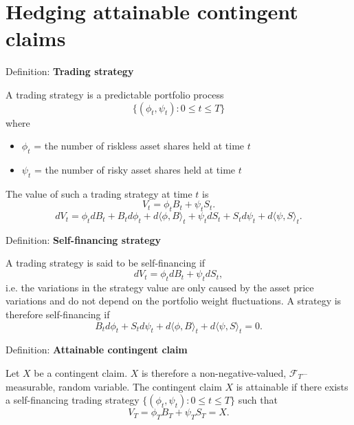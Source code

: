 \documentclass[12pt,a4paper]{article}
\begin{document}
\vspace{1em}


\section{Hedging attainable contingent claims}

Definition: \textbf{Trading strategy}
\vspace{0.5em}

A trading strategy is a predictable portfolio process
\[
\{(\phi_t, \psi_t) : 0 \leq t \leq T\}
\]
where
\begin{itemize}
	\item $\phi_t$ = the number of riskless asset shares held at time $t$
	\item $\psi_t$ = the number of risky asset shares held at time $t$
\end{itemize}
\vspace{1em}

The value of such a trading strategy at time $t$ is
\[
V_t = \phi_t B_t + \psi_t S_t.
\]
\[
dV_t = \phi_t dB_t + B_t d\phi_t + d\langle\phi, B\rangle_t + \psi_t dS_t + S_t d\psi_t + d\langle\psi, S\rangle_t.
\]
\vspace{1em}

Definition: \textbf{Self-financing strategy}
\vspace{0.5em}

A trading strategy is said to be self-financing if
\[
dV_t = \phi_t dB_t + \psi_t dS_t,
\]
i.e. the variations in the strategy value are only caused by the asset price variations and do not depend on the portfolio weight fluctuations. A strategy is therefore self-financing if
\[
B_t d\phi_t + S_t d\psi_t + d \langle\phi, B\rangle_t + d \langle\psi, S\rangle_t = 0.
\]
\vspace{1em}

Definition: \textbf{Attainable contingent claim}
\vspace{0.5em}

Let $X$ be a contingent claim. $X$ is therefore a non-negative-valued, $\mathcal{F}_T$--measurable, random variable. The contingent claim $X$ is attainable if there exists a self-financing trading strategy $\{(\phi_t, \psi_t) : 0 \leq t \leq T\}$ such that
\[
V_T = \phi_T B_T + \psi_T S_T = X.
\]
\vspace{1em}
\end{document}
